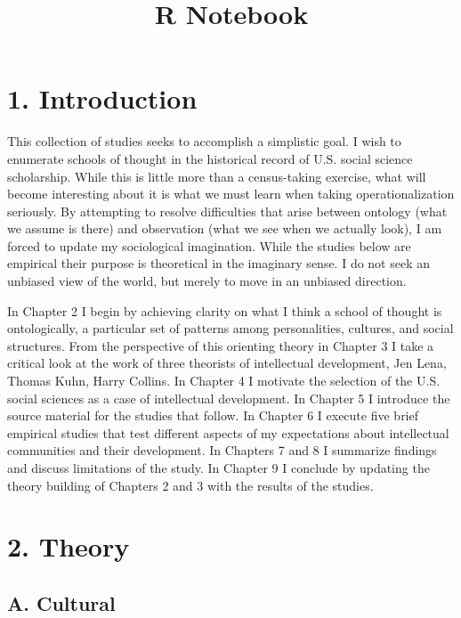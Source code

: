 \documentclass[]{article}
\title{R Notebook}
\author{}
\date{}
\begin{document}
\maketitle

{
\setcounter{tocdepth}{2}
\tableofcontents
}
\section{1. Introduction}\label{introduction}

This collection of studies seeks to accomplish a simplistic goal. I wish
to enumerate schools of thought in the historical record of U.S. social
science scholarship. While this is little more than a census-taking
exercise, what will become interesting about it is what we must learn
when taking operationalization seriously. By attempting to resolve
difficulties that arise between ontology (what we assume is there) and
observation (what we see when we actually look), I am forced to update
my sociological imagination. While the studies below are empirical their
purpose is theoretical in the imaginary sense. I do not seek an unbiased
view of the world, but merely to move in an unbiased direction.

In Chapter 2 I begin by achieving clarity on what I think a school of
thought is ontologically, a particular set of patterns among
personalities, cultures, and social structures. From the perspective of
this orienting theory in Chapter 3 I take a critical look at the work of
three theorists of intellectual development, Jen Lena, Thomas Kuhn,
Harry Collins. In Chapter 4 I motivate the selection of the U.S. social
sciences as a case of intellectual development. In Chapter 5 I introduce
the source material for the studies that follow. In Chapter 6 I execute
five brief empirical studies that test different aspects of my
expectations about intellectual communities and their development. In
Chapters 7 and 8 I summarize findings and discuss limitations of the
study. In Chapter 9 I conclude by updating the theory building of
Chapters 2 and 3 with the results of the studies.

\section{2. Theory}\label{theory}

\subsection{A. Cultural}\label{a.-cultural}
\end{document}
